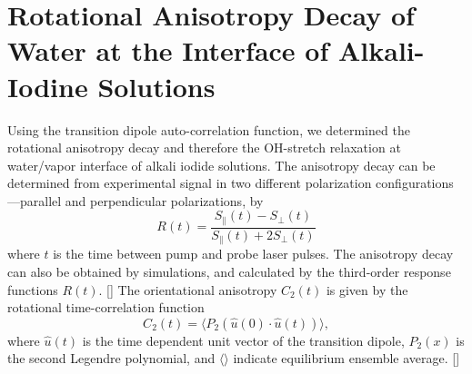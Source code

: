 \section{Rotational Anisotropy Decay of Water at the Interface of Alkali-Iodine Solutions}\label{CHAPETR_AD}
Using the transition dipole auto-correlation function, 
we determined the rotational anisotropy decay and therefore the OH-stretch relaxation at water/vapor interface of alkali iodide solutions.
The anisotropy decay can be determined from experimental signal in two different polarization configurations---parallel and perpendicular polarizations, by 
\begin{equation}
        R(t)=\frac{S_{\parallel}(t)-S_{\perp}(t)}{S_{\parallel}(t)+2S_{\perp}(t)}
\label{eq:ad}
\end{equation}
where $t$ is the time between pump and probe laser pulses.  The anisotropy decay can also be obtained by simulations, and calculated by the third-order response functions $R(t)$. [\cite{Jansen10,Jansen06}]
%
%
The orientational anisotropy $C_2(t)$ is given by the rotational time-correlation function 
\begin{equation}
C_2(t)=\langle P_2(\hat{u}(0)\cdot\hat{u}(t)) \rangle,
\label{eq:tcf2}
\end{equation}
where $\hat{u}(t)$ is the time dependent unit vector of the transition dipole, $P_2(x)$ is the second Legendre polynomial, and $\langle \rangle$ indicate 
equilibrium ensemble average. [\cite{Corcelli05,LinYS2010}] %

